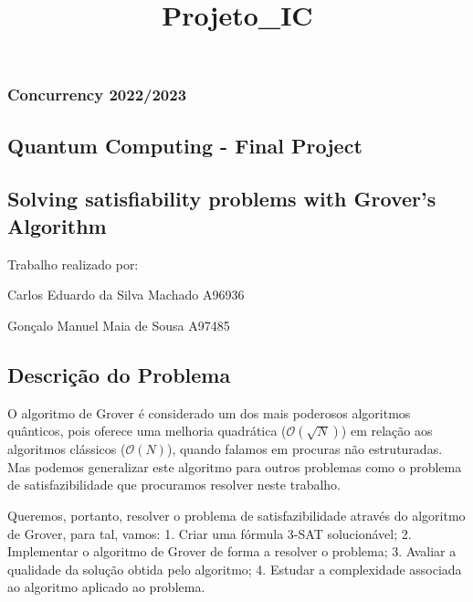 \documentclass[11pt]{article}
\title{Projeto\_IC}
\begin{document}
    
    \maketitle
    
    

    
    \hypertarget{concurrency-20222023}{%
\subsubsection{Concurrency 2022/2023}\label{concurrency-20222023}}

\hypertarget{quantum-computing---final-project}{%
\subsection{Quantum Computing - Final
Project}\label{quantum-computing---final-project}}

\hypertarget{solving-satisfiability-problems-with-grovers-algorithm}{%
\subsection{Solving satisfiability problems with Grover's
Algorithm}\label{solving-satisfiability-problems-with-grovers-algorithm}}

Trabalho realizado por:

Carlos Eduardo da Silva Machado A96936

Gonçalo Manuel Maia de Sousa A97485

    \hypertarget{descriuxe7uxe3o-do-problema}{%
\subsection{Descrição do Problema}\label{descriuxe7uxe3o-do-problema}}

    O algoritmo de Grover é considerado um dos mais poderosos algoritmos
quânticos, pois oferece uma melhoria quadrática
(\(\mathcal{O}(\sqrt{N})\)) em relação aos algoritmos clássicos
(\(\mathcal{O}(N)\)), quando falamos em procuras não estruturadas. Mas
podemos generalizar este algoritmo para outros problemas como o problema
de satisfazibilidade que procuramos resolver neste trabalho.

Queremos, portanto, resolver o problema de satisfazibilidade através do
algoritmo de Grover, para tal, vamos: 1. Criar uma fórmula 3-SAT
solucionável; 2. Implementar o algoritmo de Grover de forma a resolver o
problema; 3. Avaliar a qualidade da solução obtida pelo algoritmo; 4.
Estudar a complexidade associada ao algoritmo aplicado ao problema.
\end{document}
